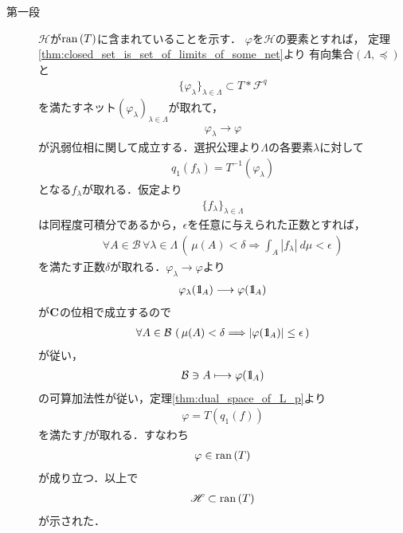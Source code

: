 	\begin{description}
		\item[第一段] $\mathscr{H}$が$\operatorname*{ran} \left(T\right)$に含まれていることを示す．
			$\varphi$を$\mathscr{H}$の要素とすれば，
			定理\ref{thm:closed_set_is_set_of_limits_of_some_net}より
			有向集合$(\Lambda,\preceq)$と
			\begin{align}
				\{\varphi_\lambda\}_{\lambda \in \Lambda} \subset T \ast \mathscr{F}^q
			\end{align}
			を満たすネット$(\varphi_\lambda)_{\lambda \in \Lambda}$が取れて，
			\begin{align}
				\varphi_\lambda \longrightarrow \varphi
			\end{align}
			が汎弱位相に関して成立する．選択公理より$\Lambda$の各要素$\lambda$に対して
			\begin{align}
				q_1(f_\lambda) = T^{-1}(\varphi_\lambda)
			\end{align}
			となる$f_\lambda$が取れる．仮定より
			\begin{align}
				\{f_\lambda\}_{\lambda \in \Lambda}
			\end{align}
			は同程度可積分であるから，$\epsilon$を任意に与えられた正数とすれば，
			\begin{align}
				\forall A \in \mathcal{B}\, \forall \lambda \in \Lambda\, 
				\left(\, \mu(A) < \delta \Longrightarrow \int_A |f_\lambda|\ d\mu < \epsilon\, \right)
			\end{align}
			を満たす正数$\delta$が取れる．$\varphi_\lambda \longrightarrow \varphi$より
			\begin{align}
				\varphi_\lambda(\mbox{1}\hspace{-0.25em}\mbox{l}_A) \longrightarrow \varphi(\mbox{1}\hspace{-0.25em}\mbox{l}_A)
			\end{align}
			が$\mathbf{C}$の位相で成立するので
			\begin{align}
				\forall A \in \mathcal{B}\, 
				\left(\, \mu(A) < \delta \Longrightarrow |\varphi(\mbox{1}\hspace{-0.25em}\mbox{l}_A)| \leq \epsilon\, \right)
			\end{align}
			が従い，
			\begin{align}
				\mathcal{B} \ni A \longmapsto \varphi(\mbox{1}\hspace{-0.25em}\mbox{l}_A)
			\end{align}
			の可算加法性が従い，定理\ref{thm:dual_space_of_L_p}より
			\begin{align}
				\varphi = T(q_1(f))
			\end{align}
			を満たす$f$が取れる．すなわち
			\begin{align}
				\varphi \in \operatorname*{ran} \left(T\right)
			\end{align}
			が成り立つ．以上で
			\begin{align}
				\mathscr{H} \subset \operatorname*{ran} \left(T\right)
			\end{align}
			が示された．
		

\end{description}
